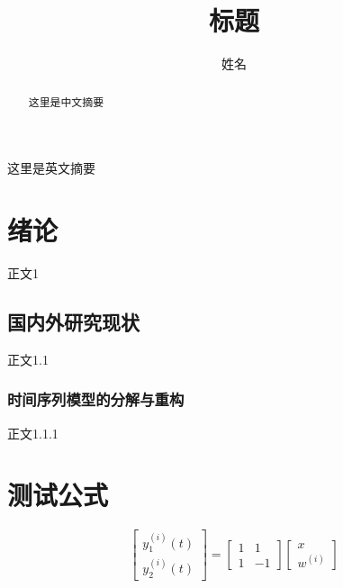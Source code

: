 \documentclass{SUIBEthesis}
\numberwithin{figure}{section}
\numberwithin{table}{section}
\begin{document}
 
\title{标题}
\author{姓名}

\maketitle

\baselineskip=20pt %
\newpage
\begin{sloppypar}
\begin{abstract}

这里是中文摘要

\end{abstract}


\newpage
\begin{enabstract}

这里是英文摘要
\end{enabstract}



\newpage
\tableofcontents
\thispagestyle{empty}


\newpage
\setcounter{page}{1} 
\pagestyle{mainpage}
\section{绪论}
正文1

\subsection{国内外研究现状}
正文1.1
\subsubsection{时间序列模型的分解与重构}
正文1.1.1

\section{测试公式}
\begin{equation}
  \left[
  \begin{array}{c}
     y_1^{(i)}(t) \\
     y_2^{(i)}(t) 
  \end{array}
  \right]
  =
  \left[
  \begin{array}{cc}
      1 & 1 \\
      1 & -1
  \end{array}
  \right]
  \left[
  \begin{array}{c}
      x \\ 
      w^(i)
  \end{array}
  \right]
  \nonumber
  \end{equation}


\end{sloppypar}
\end{document}

